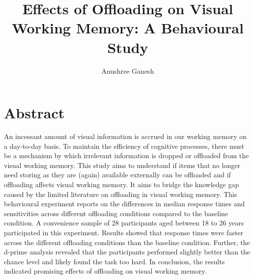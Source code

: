 \documentclass[
    a4paper,
    man,
    floatsintext,
    british
]{apa6}
\title{Effects of Offloading on Visual Working Memory: A Behavioural Study}
\author{Anushree Ganesh}
\affiliation{Utrecht University}
\begin{document}
\maketitle
\section{Abstract}
An incessant amount of visual information is accrued in our working memory on a day-to-day basis. To maintain the efficiency of cognitive processes, there must be a mechanism by which irrelevant information is dropped or offloaded from the visual working memory. This study aims to understand if items that no longer need storing as they are (again) available externally can be offloaded and if offloading affects visual working memory. It aims to bridge the knowledge gap caused by the limited literature on offloading in visual working memory. This behavioural experiment reports on the differences in median response times and sensitivities across different offloading conditions compared to the baseline condition. A convenience sample of 28 participants aged between 18 to 26 years participated in this experiment. Results showed that response times were faster across the different offloading conditions than the baseline condition. Further, the d-prime analysis revealed that the participants performed slightly better than the chance level and likely found the task too hard. In conclusion, the results indicated promising effects of offloading on visual working memory.
\end{document}
